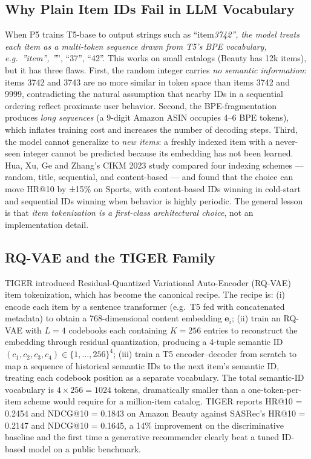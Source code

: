 \documentclass{article}
\begin{document}
\subsection{Why Plain Item IDs Fail in LLM Vocabulary}\label{why-plain-item-ids-fail-in-llm-vocabulary}

When P5 trains T5-base to output strings such as ``item\emph{3742'', the model treats each item as a multi-token sequence drawn from T5's BPE vocabulary, e.g.~''item'', ''}'', ``37'', ``42''. This works on small catalogs (Beauty has 12k items), but it has three flaws. First, the random integer carries \emph{no semantic information}: items 3742 and 3743 are no more similar in token space than items 3742 and 9999, contradicting the natural assumption that nearby IDs in a sequential ordering reflect proximate user behavior. Second, the BPE-fragmentation produces \emph{long sequences} (a 9-digit Amazon ASIN occupies 4--6 BPE tokens), which inflates training cost and increases the number of decoding steps. Third, the model cannot generalize to \emph{new items}: a freshly indexed item with a never-seen integer cannot be predicted because its embedding has not been learned. Hua, Xu, Ge and Zhang's CIKM 2023 study compared four indexing schemes --- random, title, sequential, and content-based --- and found that the choice can move HR@10 by ±15\% on Sports, with content-based IDs winning in cold-start and sequential IDs winning when behavior is highly periodic. The general lesson is that \emph{item tokenization is a first-class architectural choice}, not an implementation detail.

\subsection{RQ-VAE and the TIGER Family}\label{rq-vae-and-the-tiger-family}

TIGER \citep{rajput2023recommendersystems} introduced Residual-Quantized Variational Auto-Encoder (RQ-VAE) item tokenization, which has become the canonical recipe. The recipe is: (i) encode each item by a sentence transformer (e.g.~T5 fed with concatenated metadata) to obtain a 768-dimensional content embedding \(\mathbf{e}_i\); (ii) train an RQ-VAE with \(L=4\) codebooks each containing \(K=256\) entries to reconstruct the embedding through residual quantization, producing a 4-tuple semantic ID \((c_1, c_2, c_3, c_4) \in \{1, \dots, 256\}^4\); (iii) train a T5 encoder--decoder from scratch to map a sequence of historical semantic IDs to the next item's semantic ID, treating each codebook position as a separate vocabulary. The total semantic-ID vocabulary is \(4 \times 256 = 1024\) tokens, dramatically smaller than a one-token-per-item scheme would require for a million-item catalog. TIGER reports HR@10 = 0.2454 and NDCG@10 = 0.1843 on Amazon Beauty against SASRec's HR@10 = 0.2147 and NDCG@10 = 0.1645, a 14\% improvement on the discriminative baseline and the first time a generative recommender clearly beat a tuned ID-based model on a public benchmark.
\end{document}
